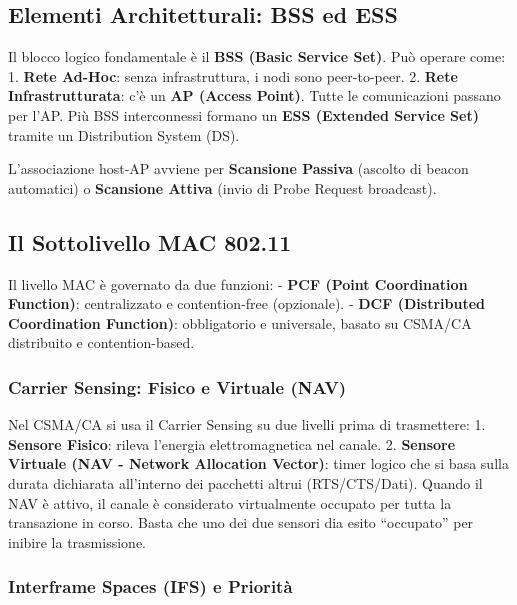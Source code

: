 \documentclass[
  italian,
  openany]{book}
\begin{document}
\subsection{Elementi Architetturali: BSS ed
ESS}\label{elementi-architetturali-bss-ed-ess}

Il blocco logico fondamentale è il \textbf{BSS (Basic Service Set)}. Può
operare come: 1. \textbf{Rete Ad-Hoc}: senza infrastruttura, i nodi sono
peer-to-peer. 2. \textbf{Rete Infrastrutturata}: c'è un \textbf{AP
(Access Point)}. Tutte le comunicazioni passano per l'AP. Più BSS
interconnessi formano un \textbf{ESS (Extended Service Set)} tramite un
Distribution System (DS).

L'associazione host-AP avviene per \textbf{Scansione Passiva} (ascolto
di beacon automatici) o \textbf{Scansione Attiva} (invio di Probe
Request broadcast).

\subsection{Il Sottolivello MAC
802.11}\label{il-sottolivello-mac-802.11}

Il livello MAC è governato da due funzioni: - \textbf{PCF (Point
Coordination Function)}: centralizzato e contention-free (opzionale). -
\textbf{DCF (Distributed Coordination Function)}: obbligatorio e
universale, basato su CSMA/CA distribuito e contention-based.

\subsubsection{Carrier Sensing: Fisico e Virtuale
(NAV)}\label{carrier-sensing-fisico-e-virtuale-nav}

Nel CSMA/CA si usa il Carrier Sensing su due livelli prima di
trasmettere: 1. \textbf{Sensore Fisico}: rileva l'energia
elettromagnetica nel canale. 2. \textbf{Sensore Virtuale (NAV - Network
Allocation Vector)}: timer logico che si basa sulla durata dichiarata
all'interno dei pacchetti altrui (RTS/CTS/Dati). Quando il NAV è attivo,
il canale è considerato virtualmente occupato per tutta la transazione
in corso. Basta che uno dei due sensori dia esito ``occupato'' per
inibire la trasmissione.

\subsubsection{Interframe Spaces (IFS) e
Priorità}\label{interframe-spaces-ifs-e-priorituxe0}
\end{document}
